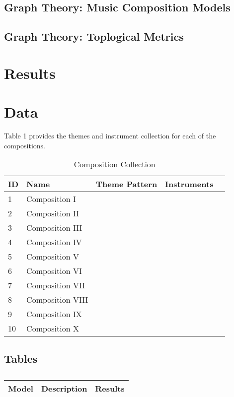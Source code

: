 \subsection{Graph Theory: Music Composition Models}

\subsection{Graph Theory: Toplogical Metrics}

\section{Results}

\section{Data}

Table 1 provides the themes and instrument collection for each of the compositions.
	
\begin{table}[H]
\caption{Composition Collection}	
\begin{tabular}{p{1cm}p{4cm}p{2cm}p{1cm}p{1cm}}
\hline
ID & Name & Theme Pattern & Instruments & \\
\hline 
1 & Composition I &  &  & \\
2 & Composition II &  &  & \\
3 & Composition III &  & \\
4 & Composition IV & & \\
5 & Composition V & & & \\
\hline 
6 & Composition VI &  &  & \\
7 & Composition VII &  &  & \\
8 & Composition VIII &  & \\
9 & Composition IX & & \\
10 & Composition X & & & \\
\end{tabular}
\end{table}




\subsection{Tables}

\centering	
\begin{table}[H]\tiny
	\caption{}	
	\begin{tabular}{r|p{4cm}|l}
		\hline	
		Model & Description & Results \\
		\hline 
		\hline 
	\end{tabular}
\end{table}


